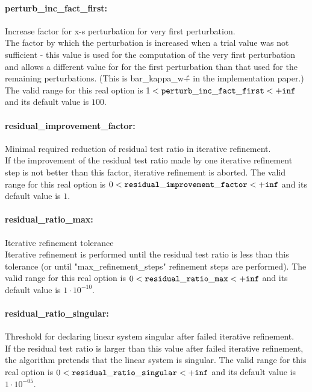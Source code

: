 \paragraph{perturb\_inc\_fact\_first:}\label{sec:perturb_inc_fact_first} Increase factor for x-s perturbation for very first perturbation. $\;$ \\
 The factor by which the perturbation is increased
when a trial value was not sufficient - this
value is used for the computation of the very
first perturbation and allows a different value
for for the first perturbation than that used for
the remaining perturbations. (This is
bar\_kappa\_w\^+ in the implementation paper.) The valid range for this real option is 
$1 <  {\tt perturb\_inc\_fact\_first } <  {\tt +inf}$
and its default value is $100$.


\paragraph{residual\_improvement\_factor:}\label{sec:residual_improvement_factor} Minimal required reduction of residual test ratio in iterative refinement. $\;$ \\
 If the improvement of the residual test ratio
made by one iterative refinement step is not
better than this factor, iterative refinement is
aborted. The valid range for this real option is 
$0 <  {\tt residual\_improvement\_factor } <  {\tt +inf}$
and its default value is $1$.


\paragraph{residual\_ratio\_max:}\label{sec:residual_ratio_max} Iterative refinement tolerance $\;$ \\
 Iterative refinement is performed until the
residual test ratio is less than this tolerance
(or until "max\_refinement\_steps" refinement
steps are performed). The valid range for this real option is 
$0 <  {\tt residual\_ratio\_max } <  {\tt +inf}$
and its default value is $1 \cdot 10^{-10}$.


\paragraph{residual\_ratio\_singular:}\label{sec:residual_ratio_singular} Threshold for declaring linear system singular after failed iterative refinement. $\;$ \\
 If the residual test ratio is larger than this
value after failed iterative refinement, the
algorithm pretends that the linear system is
singular. The valid range for this real option is 
$0 <  {\tt residual\_ratio\_singular } <  {\tt +inf}$
and its default value is $1 \cdot 10^{-05}$.


